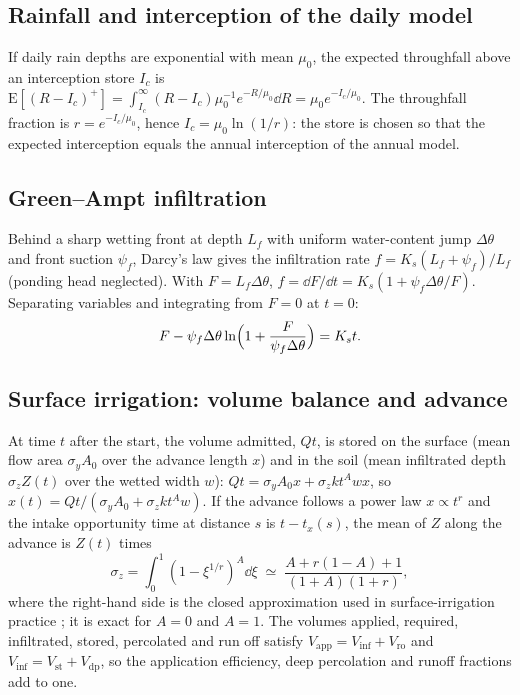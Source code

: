 \subsection{Rainfall and interception of the daily model}
If daily rain depths are exponential with mean $\mu_0$, the expected throughfall above an interception store $I_c$ is $\mathrm E[(R-I_c)^+]=\int_{I_c}^\infty(R-I_c)\mu_0^{-1}e^{-R/\mu_0}\dd R=\mu_0e^{-I_c/\mu_0}$. The throughfall fraction is $r=e^{-I_c/\mu_0}$, hence $I_c=\mu_0\ln(1/r)$: the store is chosen so that the expected interception equals the annual interception of the annual model.

\subsection{Green--Ampt infiltration}
Behind a sharp wetting front at depth $L_f$ with uniform water-content jump $\Delta\theta$ and front suction $\psi_f$, Darcy's law gives the infiltration rate $f=K_s(L_f+\psi_f)/L_f$ (ponding head neglected). With $F=L_f\Delta\theta$, $f=\dd F/\dd t=K_s(1+\psi_f\Delta\theta/F)$. Separating variables and integrating from $F=0$ at $t=0$:
\begin{equation}F-\psi_f\Delta\theta\ln\Bigl(1+\frac{F}{\psi_f\Delta\theta}\Bigr)=K_st.\end{equation}

\subsection{Surface irrigation: volume balance and advance}
At time $t$ after the start, the volume admitted, $Qt$, is stored on the surface (mean flow area $\sigma_yA_0$ over the advance length $x$) and in the soil (mean infiltrated depth $\sigma_zZ(t)$ over the wetted width $w$): $Qt=\sigma_yA_0x+\sigma_zkt^{A}wx$, so $x(t)=Qt/(\sigma_yA_0+\sigma_zkt^{A}w)$. If the advance follows a power law $x\propto t^{r}$ and the intake opportunity time at distance $s$ is $t-t_x(s)$, the mean of $Z$ along the advance is $Z(t)$ times
\begin{equation}\sigma_z=\int_0^1(1-\xi^{1/r})^{A}\dd\xi\;\simeq\;\frac{A+r(1-A)+1}{(1+A)(1+r)},\end{equation}where the right-hand side is the closed approximation used in surface-irrigation practice \citep{Walker1987}; it is exact for $A=0$ and $A=1$.
The volumes applied, required, infiltrated, stored, percolated and run off satisfy $V_{\mathrm{app}}=V_{\mathrm{inf}}+V_{\mathrm{ro}}$ and $V_{\mathrm{inf}}=V_{\mathrm{st}}+V_{\mathrm{dp}}$, so the application efficiency, deep percolation and runoff fractions add to one.

